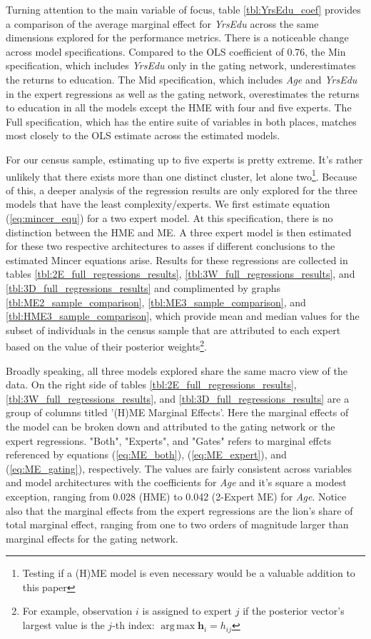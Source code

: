 \documentclass[12pt]{article}
\DeclareMathOperator*{\argmax}{arg\,max}
\begin{document}
Turning attention to the main variable of focus, table \ref{tbl:YrsEdu_coef} provides a 
comparison of the average marginal effect for \textit{YrsEdu} across the same dimensions
explored for the performance metrics. There is a noticeable change across model specifications.
Compared to the OLS coefficient of 0.76, the Min specification,
which includes \textit{YrsEdu} only in the gating network, underestimates the returns
to education. The Mid specification, which includes \textit{Age} and
\textit{YrsEdu} in the expert regressions as well as the gating network,
overestimates the returns to education in all the models except the HME with four
and five experts. The Full specification, which has the entire suite of
variables in both places, matches most closely to the OLS estimate across the estimated
models.

For our census sample, estimating up to five experts is pretty extreme.
It's rather unlikely that there exists more than one distinct cluster, let alone two\footnote{Testing if a (H)ME model is even necessary would be a valuable addition to this paper}.
Because of this, a deeper analysis of the regression results are only explored
for the three models that have the least complexity/experts. We first estimate equation (\ref{eq:mincer_equ}) 
for a two expert model. At this specification, there is no distinction
between the HME and ME. A three expert model is then estimated for these two
respective architectures to asses if different conclusions to the estimated
Mincer equations arise. Results for these regressions are collected in tables \ref{tbl:2E_full_regressions_results},
\ref{tbl:3W_full_regressions_results}, and \ref{tbl:3D_full_regressions_results}
and complimented by graphs \ref{tbl:ME2_sample_comparison}, \ref{tbl:ME3_sample_comparison},
and \ref{tbl:HME3_sample_comparison}, which provide mean and median values for the subset of individuals
in the census sample that are attributed to each expert based on the value of
their posterior weights\footnote{For example, observation $i$ is assigned to expert $j$ if the posterior vector's largest value is the $j$-th index: $\argmax \boldsymbol{h}_{i} = h_{ij}$}.

Broadly speaking, all three models explored share the same macro view of the data.
On the right side of tables \ref{tbl:2E_full_regressions_results},
\ref{tbl:3W_full_regressions_results}, and \ref{tbl:3D_full_regressions_results}
are a group of columns titled '(H)ME Marginal Effects'.
Here the marginal effects of the model can be broken down and attributed to the
gating network or the expert regressions. "Both", "Experts", and "Gates" refers to marginal effcts referenced by equations
(\ref{eq:ME_both}), (\ref{eq:ME_expert}), and (\ref{eq:ME_gating}),
respectively. The values are fairly consistent across variables and model
architectures with the coefficients for \textit{Age} and it's square a modest exception,
ranging from 0.028 (HME) to 0.042 (2-Expert ME) for \textit{Age}. Notice also that the
marginal effects from the expert regressions are the lion's share of total marginal effect,
ranging from one to two orders of magnitude larger than marginal effects for the gating
network.
\end{document}
